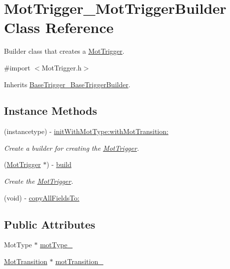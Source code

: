\hypertarget{interface_mot_trigger___mot_trigger_builder}{}\section{Mot\+Trigger\+\_\+\+Mot\+Trigger\+Builder Class Reference}
\label{interface_mot_trigger___mot_trigger_builder}


Builder class that creates a \hyperlink{interface_mot_trigger}{Mot\+Trigger}.  




{\ttfamily \#import $<$Mot\+Trigger.\+h$>$}



Inherits \hyperlink{interface_base_trigger___base_trigger_builder}{Base\+Trigger\+\_\+\+Base\+Trigger\+Builder}.

\subsection*{Instance Methods}
\begin{DoxyCompactItemize}
\item 
(instancetype) -\/ \hyperlink{interface_mot_trigger___mot_trigger_builder_a8afbe1d91ba2de8465198eb3dd97bb41}{init\+With\+Mot\+Type\+:with\+Mot\+Transition\+:}
\begin{DoxyCompactList}\small\item\em Create a builder for creating the \hyperlink{interface_mot_trigger}{Mot\+Trigger}. \end{DoxyCompactList}\item 
(\hyperlink{interface_mot_trigger}{Mot\+Trigger} $\ast$) -\/ \hyperlink{interface_mot_trigger___mot_trigger_builder_ae998df862e85d4eda620924f79cacbfd}{build}
\begin{DoxyCompactList}\small\item\em Create the \hyperlink{interface_mot_trigger}{Mot\+Trigger}. \end{DoxyCompactList}\item 
(void) -\/ \hyperlink{interface_mot_trigger___mot_trigger_builder_a984cda9314034a673e9d2014541e916d}{copy\+All\+Fields\+To\+:}
\end{DoxyCompactItemize}
\subsection*{Public Attributes}
\begin{DoxyCompactItemize}
\item 
Mot\+Type $\ast$ \hyperlink{interface_mot_trigger___mot_trigger_builder_a4c9134b7a6aac2bd06fb1fe1ecbaeb39}{mot\+Type\+\_\+}
\item 
\hyperlink{interface_mot_transition}{Mot\+Transition} $\ast$ \hyperlink{interface_mot_trigger___mot_trigger_builder_a1557515af3c9db6a78bdd909a1166473}{mot\+Transition\+\_\+}
\end{DoxyCompactItemize}


